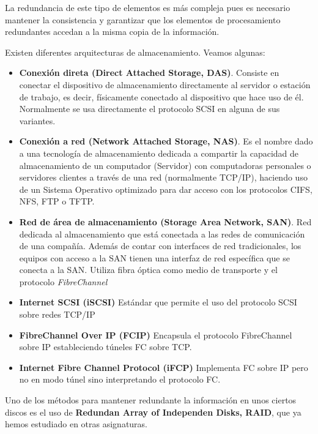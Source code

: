 \documentclass{apuntes}[nochap]
\begin{document}
La redundancia de este tipo de elementos es más compleja pues es necesario mantener la consistencia y garantizar que los elementos de procesamiento redundantes accedan a la misma copia de la información.

Existen diferentes arquitecturas de almacenamiento. Veamos algunas:
\begin{itemize}
\item \textbf{Conexión direta (Direct Attached Storage, DAS)}. Consiste en conectar el dispositivo de almacenamiento directamente al servidor o estación de trabajo, es decir, físicamente conectado al dispositivo que hace uso de él. Normalmente se usa directamente el protocolo SCSI en alguna de sus variantes.

\item \textbf{Conexión a red (Network Attached Storage, NAS)}. Es el nombre dado a una tecnología de almacenamiento dedicada a compartir la capacidad de almacenamiento de un computador (Servidor) con computadoras personales o servidores clientes a través de una red (normalmente TCP/IP), haciendo uso de un Sistema Operativo optimizado para dar acceso con los protocolos CIFS, NFS, FTP o TFTP.

\item \textbf{Red de área de almacenamiento (Storage Area Network, SAN)}. Red dedicada al almacenamiento que está conectada a las redes de comunicación de una compañía. Además de contar con interfaces de red tradicionales, los equipos con acceso a la SAN tienen una interfaz de red específica que se conecta a la SAN. Utiliza fibra óptica como medio de transporte y el protocolo \textit{FibreChannel}

\item \textbf{Internet SCSI (iSCSI)} Estándar que permite el uso del protocolo SCSI sobre redes TCP/IP

\item \textbf{FibreChannel Over IP (FCIP)} Encapsula el protocolo FibreChannel sobre IP estableciendo túneles FC sobre TCP.

\item \textbf{Internet Fibre Channel Protocol (iFCP)} Implementa FC sobre IP pero no en modo túnel sino interpretando el protocolo FC.
\end{itemize}

Uno de los métodos para mantener redundante la información en unos ciertos discos es el uso de \textbf{Redundan Array of Independen Disks, RAID}, que ya hemos estudiado en otras asignaturas.
\end{document}

